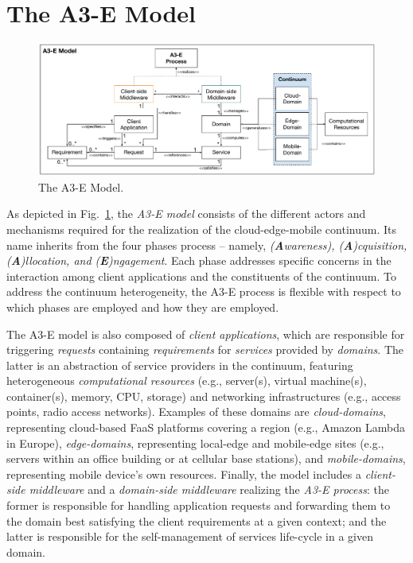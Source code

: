 \section{The A3-E Model}\label{sec:proposal}

\begin{figure}[tbp]
	\includegraphics[width=1\textwidth]{figs/A3-E-model.pdf}
	\caption{The A3-E Model.}
	\label{fig:A3-E-model}
\end{figure}

As depicted in Fig.~\ref{fig:A3-E-model}, the \textit{A3-E model} consists of the different actors and mechanisms required for the realization of the cloud-edge-mobile continuum. Its name inherits from the four phases process -- namely, \textit{(\textbf{A}wareness), (\textbf{A})cquisition, (\textbf{A})llocation, and (\textbf{E})ngagement}. Each phase addresses specific concerns in the interaction among client applications and the constituents of the continuum. To address the continuum heterogeneity, the A3-E process is flexible with respect to which phases are employed and how they are employed.

The A3-E model is also composed of \textit{client applications}, which are responsible for triggering \textit{requests} containing \textit{requirements} for  \textit{services} provided by \textit{domains}. The latter is an abstraction of service providers in the continuum, featuring heterogeneous \textit{computational resources} (e.g., server(s), virtual machine(s), container(s), memory, CPU, storage) and networking infrastructures (e.g., access points, radio access networks). Examples of these domains are \textit{cloud-domains}, representing cloud-based FaaS platforms covering a region (e.g., Amazon Lambda in Europe), \textit{edge-domains}, representing local-edge and mobile-edge sites (e.g., servers within an office building or at cellular base stations), and \textit{mobile-domains}, representing mobile device's own resources.
Finally, the model includes a \textit{client-side middleware} and a \textit{domain-side middleware} realizing the \textit{A3-E process}: the former is responsible for handling application requests and forwarding them to the domain best satisfying the client requirements at a given context; and the latter is responsible for the self-management of services life-cycle in a given domain. 

